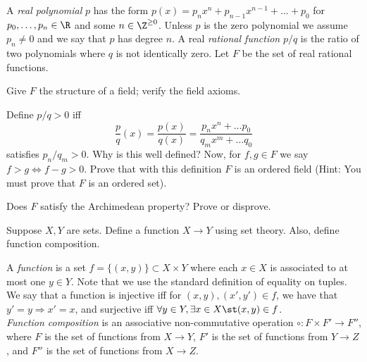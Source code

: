 \documentclass{assignment}
\begin{document}
\begin{question}[2]
  A \emph{real polynomial} $p$ has the form $p(x) = p_nx^n + p_{n-1}x^{n-1} + \ldots + p_0$ for $p_0,
\ldots, p_n\in\R$ and some $n\in\Z^{\geq0}$. Unless $p$ is the zero polynomial we assume $p_n\neq 0$ 
and we say that $p$ has degree $n$. A real \emph{rational function} $p/q$ is the ratio of two polynomials
where $q$ is not identically zero. Let $F$ be the set of real rational functions. \\

\begin{qparts}
  \item Give $F$ the structure of a field; verify the field axioms.
  \item Define $p/q >0$ iff $$\frac{p}{q}(x) = \frac{p(x)}{q(x)} = \frac{p_nx^n + \ldots p_0}{q_mx^m
 + \ldots q_0}$$ satisfies $p_n/q_m > 0.$ Why is this well defined? Now, for $f,g\in F$ we say $f > g
\iff f- g > 0$. Prove that with this definition $F$ is an ordered field (Hint: You must prove that $F$
is an ordered set).
  \item Does $F$ satisfy the Archimedean property? Prove or disprove.
\end{qparts}
\end{question}

\begin{question}[3]
  Suppose $X,Y$ are sets. Define a function $X \to Y$ using set theory. Also, define function composition.
\end{question}
A \emph{function} is a set $f = \{(x,y)\} \subset X\times Y$ where each $x\in X$ is associated to at
most one $y\in Y$. Note that we use the standard definition of equality on tuples. We say that a
function is injective iff for $(x, y), (x', y')\in f$, we have that $y' = y \Rightarrow x' = x$, and
surjective iff $\forall y\in Y, \exists x\in X \st (x,y)\in f$. \\

\emph{Function composition} is an associative non-commutative operation $\circ: F\times F' \to F''$,
where $F$ is the set of functions from $X\to Y$, $F'$ is the set of functions from $Y\to Z$, and
$F''$ is the set of functions from $X\to Z$. 
\end{document}
